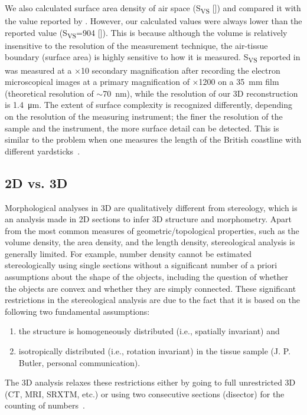 We also calculated surface area density of air space (S\textsubscript{VS} [\centimetresquared\per\centimetrecubed]) and compared it with the value reported by \cite{Tschanz2003}. However, our calculated values were always lower than the reported value (S\textsubscript{VS}=904 [\centimetresquared\per\centimetrecubed]). This is because although the volume is relatively insensitive to the resolution of the measurement technique, the air-tissue boundary (surface area) is highly sensitive to how it is measured. S\textsubscript{VS} reported in \citet{Tschanz2003} was measured at a $\times$10 secondary magnification after recording the electron microscopical images at a primary magnification of $\times$1200 on a \SI{35}{\milli\meter} film (theoretical resolution of $\sim$\SI{70}{\nano\meter}), while the resolution of our 3D reconstruction is \SI{1.4}{\micro\meter}. The extent of surface complexity is recognized differently, depending on the resolution of the measuring instrument; the finer the resolution of the sample and the instrument, the more surface detail can be detected. This is similar to the problem when one measures the length of the British coastline with different yardsticks~\cite{Mandelbrot1967}.

\subsection{2D vs. 3D}
Morphological analyses in 3D are qualitatively different from stereology, which is an analysis made in 2D sections to infer 3D structure and morphometry. Apart from the most common measures of geometric/topological properties, such as the volume density, the area density, and the length density, stereological analysis is generally limited. For example, number density cannot be estimated stereologically using single sections without a significant number of a priori assumptions about the shape of the objects, including the question of whether the objects are convex and whether they are simply connected. These significant restrictions in the stereological analysis are due to the fact that it is based on the following two fundamental assumptions: 
\begin{enumerate}
	\item the structure is homogeneously distributed (i.e., spatially invariant) and 
	\item isotropically distributed (i.e., rotation invariant) in the tissue sample (J. P. Butler, personal communication). 
\end{enumerate}
The 3D analysis relaxes these restrictions either by going to full unrestricted 3D (\micro CT, MRI, SRXTM, etc.) or using two consecutive sections (disector) for the counting of numbers~\cite{Hyde2007}.

